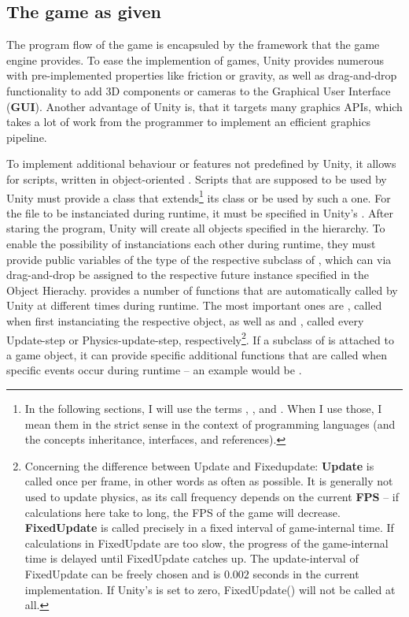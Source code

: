 \subsection{The game as given}
\label{ch:gamedescription}

The program flow of the game is encapsuled by the framework that the game engine  provides. To ease the implemention of games, Unity provides numerous  with pre-implemented properties like friction or gravity, as well as drag-and-drop functionality to add 3D components or cameras to the Graphical User Interface (\textbf{GUI}). Another advantage of Unity is, that it targets many graphics APIs, which takes a lot of work from the programmer to implement an efficient graphics pipeline.

To implement additional behaviour or features not predefined by Unity, it allows for scripts, written in object-oriented . Scripts that are supposed to be used by Unity must provide a class that extends\footnote{In the following sections, I will use the terms , ,  and . When I use those, I mean them in the strict sense in the context of programming languages (and the concepts inheritance, interfaces, and references).} its class  or be used by such a one. 
For the file to be instanciated during runtime, it must be specified in Unity's . After staring the program, Unity will create all objects specified in the hierarchy. To enable the possibility of instanciations  each other during runtime, they must provide public variables of the type of the respective subclass of , which can via drag-and-drop be assigned to the respective future instance specified in the Object Hierachy.  provides a number of functions that are automatically called by Unity at different times during runtime. The most important ones are , called when first instanciating the respective object, as well as  and , called every Update-step or Physics-update-step, respectively\footnote{Concerning the difference between Update and Fixedupdate: \textbf{Update} is called once per frame, in other words as often as possible. It is generally not used to update physics, as its call frequency depends on the current \textbf{FPS} -- if calculations here take to long, the FPS of the game will decrease. \textbf{FixedUpdate} is called precisely in a fixed interval of game-internal time. If calculations in FixedUpdate are too slow, the progress of the game-internal time is delayed until FixedUpdate catches up. The update-interval of FixedUpdate can be freely chosen and is $0.002$ seconds in the current implementation. If Unity's  is set to zero, FixedUpdate() will not be called at all.}. If a subclass of  is attached to a game object, it can provide specific additional functions that are called when specific events occur during runtime -- an example would be .\\

